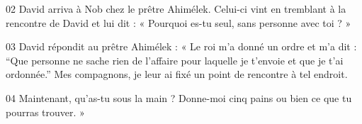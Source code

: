 
02 David arriva à Nob chez le prêtre Ahimélek. Celui-ci vint en tremblant à la rencontre de David et lui dit : « Pourquoi es-tu seul, sans personne avec toi ? »

03 David répondit au prêtre Ahimélek : « Le roi m’a donné un ordre et m’a dit : “Que personne ne sache rien de l’affaire pour laquelle je t’envoie et que je t’ai ordonnée.” Mes compagnons, je leur ai fixé un point de rencontre à tel endroit.

04 Maintenant, qu’as-tu sous la main ? Donne-moi cinq pains ou bien ce que tu pourras trouver. »

